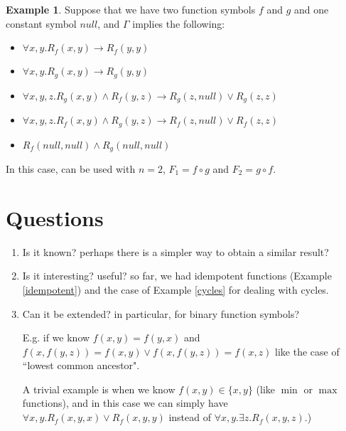 \documentclass[11pt,a4paper,oneside]{article}
\theoremstyle{definition}
\newtheorem{proposition}[definition]{Proposition}
\newtheorem{example}[definition]{Example}
\theoremstyle{remark}
\newcommand{\til}{,\dots,}
\begin{document}
\begin{example}
Suppose that we have two function symbols $f$ and $g$ and one constant symbol $null$, and $\Gamma$ implies the following:
\begin{itemize}
\item $\forall x, y. R_f(x,y) \to R_f (y,y)$
\item $\forall x, y. R_g(x,y) \to R_g (y,y)$
\item $\forall x,y,z. R_g(x,y) \land R_f(y,z) \to  R_g(z,null) \lor R_g(z,z)$
\item $\forall x,y,z. R_f(x,y) \land R_g(y,z) \to  R_f(z,null) \lor R_f(z,z)$
\item $R_f(null,null) \land R_g(null,null)$
\end{itemize}
In this case,  can be used with
$n=2$, $F_1=f \circ g$ and $F_2=g \circ f$.
\end{example}





\section*{Questions}
\begin{enumerate}
\item Is it known? perhaps there is a simpler way to obtain a similar result?
\item Is it interesting? useful? so far, we had idempotent functions (Example \ref{idempotent}) and the case of Example \ref{cycles} for dealing with cycles.
\item Can it be extended? in particular, for binary function symbols?

E.g. if we know $f(x,y)=f(y,x)$ and $f(x,f(y,z))=f(x,y) \lor f(x,f(y,z))=f(x,z)$ like the case of ``lowest common ancestor".

A trivial example is when we know $f(x,y)\in \{x,y\}$ (like $\min$ or $\max$ functions), and in this case we can simply have
$\forall x,y. R_f(x,y,x) \lor R_f(x,y,y)$ instead of $\forall x,y. \exists z. R_f(x,y,z)$.)

\end{enumerate}
\end{document}
